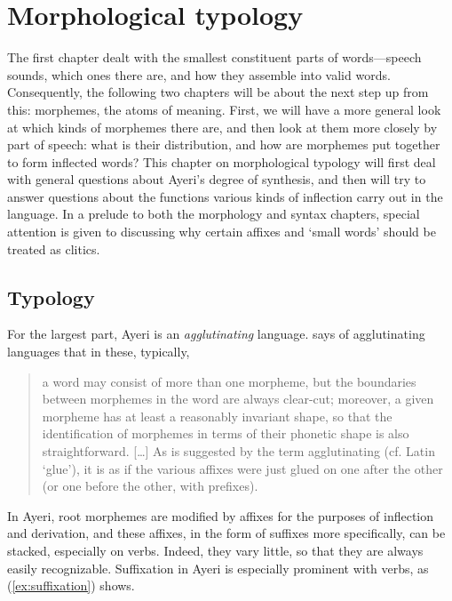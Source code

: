 \chapter{Morphological typology}
\label{ch:morphtyp}

The first chapter dealt with the smallest constituent parts of words---speech
sounds, which ones there are, and how they assemble into valid words.
Consequently, the following two chapters will be about the next step up from
this: morphemes, the atoms of meaning. First, we will have a more general look
at which kinds of morphemes there are, and then look at them more closely by
part of speech: what is their distribution, and how are morphemes put together
to form inflected words? This chapter on morphological typology will first deal
with general questions about Ayeri's degree of synthesis, and then will try to
answer questions about the functions various kinds of inflection carry out in
the language. In a prelude to both the morphology and syntax chapters, special
attention is given to discussing why certain affixes and `small words' should
be treated as clitics.

\section{Typology}
\label{sec:typology}

For the largest part, Ayeri is an \emph{agglutinating} 
language. \citet{comrie1989} says of agglutinating languages that in these, 
typically,

\blockcquote[43--44]{comrie1989}{a word may consist of more than one morpheme,
but the boundaries between morphemes in the word are always clear-cut;
moreover, a given morpheme has at least a reasonably invariant shape, so that
the identification of morphemes in terms of their phonetic shape is also
straightforward. […] As is suggested by the term agglutinating (cf. Latin
 `glue'), it is as if the various affixes were just glued on one 
after the other (or one before the other, with prefixes).}

In Ayeri, root morphemes are modified by affixes for the purposes of inflection
and derivation, and these affixes, in the form of suffixes more
specifically, can be stacked, especially on verbs. Indeed, they vary little, so
that they are always easily recognizable. Suffixation in Ayeri is especially
prominent with verbs, as (\ref{ex:suffixation}) shows.


